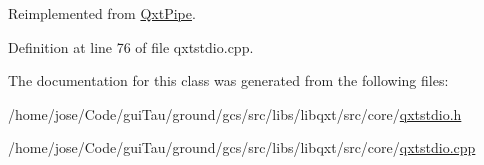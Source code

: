 Reimplemented from \hyperlink{class_qxt_pipe_a48b0a21c464d5d9d3cacb8b90a7cf244}{Qxt\-Pipe}.



Definition at line 76 of file qxtstdio.\-cpp.



The documentation for this class was generated from the following files\-:\begin{DoxyCompactItemize}
\item 
/home/jose/\-Code/gui\-Tau/ground/gcs/src/libs/libqxt/src/core/\hyperlink{qxtstdio_8h}{qxtstdio.\-h}\item 
/home/jose/\-Code/gui\-Tau/ground/gcs/src/libs/libqxt/src/core/\hyperlink{qxtstdio_8cpp}{qxtstdio.\-cpp}\end{DoxyCompactItemize}
